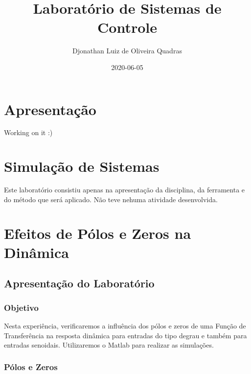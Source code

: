 \documentclass[
]{book}
\title{Laboratório de Sistemas de Controle}
\author{Djonathan Luiz de Oliveira Quadras}
\date{2020-06-05}
\begin{document}
\maketitle

{
\setcounter{tocdepth}{1}
\tableofcontents
}
\hypertarget{apresentauxe7uxe3o}{%
\chapter*{Apresentação}\label{apresentauxe7uxe3o}}

Working on it :)

\hypertarget{simulauxe7uxe3o-de-sistemas}{%
\chapter{Simulação de Sistemas}\label{simulauxe7uxe3o-de-sistemas}}

Este laboratório consistiu apenas na apresentação da disciplina, da ferramenta e do método que será aplicado. Não teve nehuma atividade desenvolvida.

\hypertarget{efeitos-de-puxf3los-e-zeros-na-dinuxe2mica}{%
\chapter{Efeitos de Pólos e Zeros na Dinâmica}\label{efeitos-de-puxf3los-e-zeros-na-dinuxe2mica}}

\hypertarget{apresentauxe7uxe3o-do-laboratuxf3rio}{%
\section{Apresentação do Laboratório}\label{apresentauxe7uxe3o-do-laboratuxf3rio}}

\hypertarget{objetivo}{%
\subsection{Objetivo}\label{objetivo}}

Nesta experiência, verificaremos a influência dos pólos e zeros de uma Função de Transferência na resposta dinâmica para entradas do tipo degrau e também para entradas senoidais. Utilizaremos o Matlab para realizar as
simulações.

\hypertarget{puxf3los-e-zeros}{%
\subsection{Pólos e Zeros}\label{puxf3los-e-zeros}}
\end{document}

